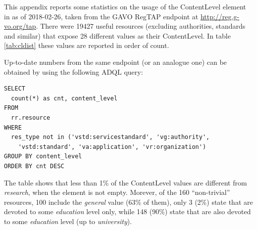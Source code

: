 \documentclass{ivoa}
\begin{document}
This appendix reports some statistics on the usage of the ContentLevel 
element in \citep{2008ivoa.spec.0222P} as of 2018-02-26, taken from the
GAVO RegTAP endpoint at \url{http://reg.g-vo.org/tap}.
There were 19427 useful resources (excluding authorities, standards and
similar) that expose 28 different values as their ContentLevel.
In table \ref{tab:cldist} these values are reported in order of count.

Up-to-date numbers from the same endpoint (or an analogue 
one) can be obtained by using the following ADQL query:

\begin{verbatim}
SELECT 
  count(*) as cnt, content_level
FROM 
  rr.resource
WHERE
  res_type not in ('vstd:servicestandard', 'vg:authority', 
    'vstd:standard', 'va:application', 'vr:organization')
GROUP BY content_level
ORDER BY cnt DESC
\end{verbatim}

The table shows that less than 1\% of the ContentLevel values 
are different from
\emph{research}, when 
the element is not empty. Morever, of the 160 ``non-trivial'' resources,
100 include the \emph{general} value (63\% of them), 
only 3 (2\%) state that are devoted to some 
\emph{education} level only,
while 148 (90\%) state that are also devoted to some 
\emph{education} level (up to 
\emph{university}).


\end{document}
